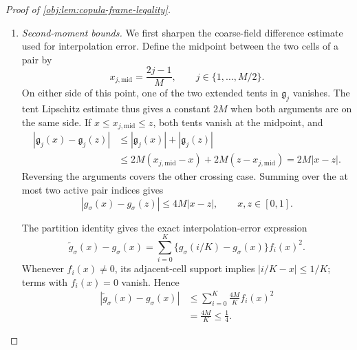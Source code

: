 \begin{proof}[Proof of \cref{obj:lem:copula-frame-legality}]
\begin{enumerate}
Every coarse cell has the same fine-grid sample sum of its unsigned tent. More precisely, support of the extended tent and the change of index
\(i=i_{\mathrm c}r_{\mathrm{grid}}+h_{\mathrm{grid}}\) give
\[
\sum_{i=0}^{K}
 b_{\triangle,\mathrm{ext}}(Mi/K-i_{\mathrm c})
=
\sum_{h_{\mathrm{grid}}=0}^{r_{\mathrm{grid}}}
 b_\triangle(h_{\mathrm{grid}}/r_{\mathrm{grid}}),
\qquad
i_{\mathrm c}\in\{0,\ldots,M-1\}.
\]
The two cells in each signed pair therefore have equal sample sums and opposite signs. Consequently,
\[
\sum_{i=0}^{K}g_\sigma(i/K)=0,
\qquad g_\sigma(0)=g_\sigma(1)=0.
\]
In particular,
\[
\sum_{i=0}^{K-1}g_\sigma(i/K)=0,
\qquad
\sum_{i=0}^{K-1}g_\sigma((i+1)/K)=0.
\]

Integrating the sine and cosine squares over one fine cell, by an affine change of variable, gives
\[
\int_{i/K}^{(i+1)/K}\cos^2\theta_i(x)\,dx
=
\int_{i/K}^{(i+1)/K}\sin^2\theta_i(x)\,dx
=\frac1{2K}.
\]
The cell formula therefore yields
\[
\begin{aligned}
\int_0^1\widetilde g_\sigma(x)\,\lambda(dx)
&=\sum_{i=0}^{K-1}
 \frac{g_\sigma(i/K)+g_\sigma((i+1)/K)}{2K}\\
&=0.
\end{aligned}
\]

\item \textit{Second-moment bounds.}
We first sharpen the coarse-field difference estimate used for interpolation error. Define the midpoint between the two cells of a pair by
\[
x_{j,\mathrm{mid}}=\frac{2j-1}{M},
\qquad j\in\{1,\ldots,M/2\}.
\]
On either side of this point, one of the two extended tents in
\(\mathfrak g_j\) vanishes. The tent Lipschitz estimate thus gives a constant \(2M\) when both arguments are on the same side. If
\(x\le x_{j,\mathrm{mid}}\le z\), both tents vanish at the midpoint, and
\[
\begin{aligned}
|\mathfrak g_j(x)-\mathfrak g_j(z)|
&\le|\mathfrak g_j(x)|+|\mathfrak g_j(z)|\\
&\le2M(x_{j,\mathrm{mid}}-x)
     +2M(z-x_{j,\mathrm{mid}})
=2M|x-z|.
\end{aligned}
\]
Reversing the arguments covers the other crossing case. Summing over the at most two active pair indices gives
\[
|g_\sigma(x)-g_\sigma(z)|\le4M|x-z|,
\qquad x,z\in[0,1].
\]

The partition identity gives the exact interpolation-error expression
\[
\widetilde g_\sigma(x)-g_\sigma(x)
=
\sum_{i=0}^{K}
 \{g_\sigma(i/K)-g_\sigma(x)\}f_i(x)^2.
\]
Whenever \(f_i(x)\ne0\), its adjacent-cell support implies
\(|i/K-x|\le1/K\); terms with \(f_i(x)=0\) vanish. Hence
\[
\begin{aligned}
|\widetilde g_\sigma(x)-g_\sigma(x)|
&\le\sum_{i=0}^{K}\frac{4M}{K}f_i(x)^2\\
&=\frac{4M}{K}\le\frac14.
\end{aligned}
\]


\end{enumerate}
\end{proof}
